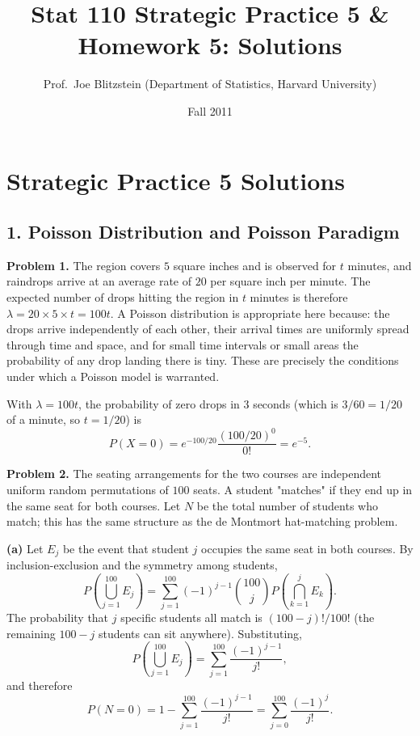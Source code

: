\documentclass{article}
\title{Stat 110 Strategic Practice 5 \& Homework 5: Solutions}
\author{Prof.\ Joe Blitzstein (Department of Statistics, Harvard University)}
\date{Fall 2011}
\begin{document}
\maketitle

\section*{Strategic Practice 5 Solutions}

\subsection*{1. Poisson Distribution and Poisson Paradigm}

\textbf{Problem 1.} The region covers $5$ square inches and is observed for $t$ minutes, and raindrops arrive at an average rate of $20$ per square inch per minute. The expected number of drops hitting the region in $t$ minutes is therefore $\lambda = 20 \times 5 \times t = 100t$. A Poisson distribution is appropriate here because: the drops arrive independently of each other, their arrival times are uniformly spread through time and space, and for small time intervals or small areas the probability of any drop landing there is tiny. These are precisely the conditions under which a Poisson model is warranted.

With $\lambda = 100t$, the probability of zero drops in $3$ seconds (which is $3/60 = 1/20$ of a minute, so $t = 1/20$) is
$$
P(X = 0) = e^{-100/20} \frac{(100/20)^0}{0!} = e^{-5}.
$$

\bigskip
\textbf{Problem 2.} The seating arrangements for the two courses are independent uniform random permutations of $100$ seats. A student "matches" if they end up in the same seat for both courses. Let $N$ be the total number of students who match; this has the same structure as the de Montmort hat-matching problem.

\textbf{(a)} Let $E_j$ be the event that student $j$ occupies the same seat in both courses. By inclusion-exclusion and the symmetry among students,
$$
P\!\left(\bigcup_{j=1}^{100} E_j\right) = \sum_{j=1}^{100}(-1)^{j-1}\binom{100}{j}P\!\left(\bigcap_{k=1}^{j}E_k\right).
$$
The probability that $j$ specific students all match is $(100-j)!/100!$ (the remaining $100-j$ students can sit anywhere). Substituting,
$$
P\!\left(\bigcup_{j=1}^{100}E_j\right) = \sum_{j=1}^{100}\frac{(-1)^{j-1}}{j!},
$$
and therefore
$$
P(N=0) = 1 - \sum_{j=1}^{100}\frac{(-1)^{j-1}}{j!} = \sum_{j=0}^{100}\frac{(-1)^j}{j!}.
$$
\end{document}
